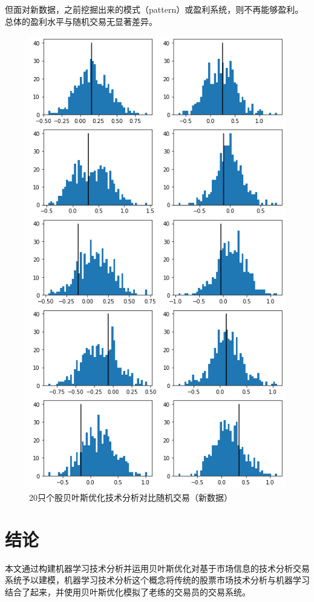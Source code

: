 \documentclass[twoside,longtitle]{LZUthesis}
\begin{document}
但面对新数据，之前挖掘出来的模式（pattern）或盈利系统，则不再能够盈利。总体的盈利水平与随机交易无显著差异。

\begin{figure}[h]
    \centering
    \includegraphics[scale=0.7]{fig5-8.png}
    \caption{20只个股贝叶斯优化技术分析对比随机交易（新数据）}
    \label{fig:my_label}
\end{figure}




\chapter{结论}
本文通过构建机器学习技术分析并运用贝叶斯优化对基于市场信息的技术分析交易系统予以建模，机器学习技术分析这个概念将传统的股票市场技术分析与机器学习结合了起来，并使用贝叶斯优化模拟了老练的交易员的交易系统。
\end{document}
